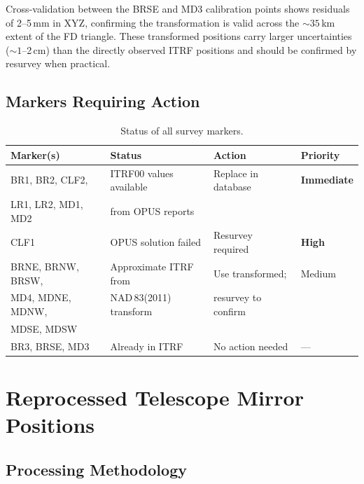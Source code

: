 \documentclass[11pt,letterpaper]{article}
\begin{document}
\noindent Cross-validation between the BRSE and MD3 calibration points shows residuals of 2--5\,mm in XYZ, confirming the transformation is valid across the $\sim\!35$\,km extent of the FD triangle. These transformed positions carry larger uncertainties ($\sim\!1$--2\,cm) than the directly observed ITRF positions and should be confirmed by resurvey when practical.

\subsection{Markers Requiring Action}

\begin{table}[H]
\centering
\caption{Status of all survey markers.}
\label{tab:status}
\smallskip
\begin{tabular}{@{}llll@{}}
\toprule
{Marker(s)} & {Status} & {Action} & {Priority} \\
\midrule
BR1, BR2, CLF2,     & ITRF00 values available & Replace in database & \textcolor{TAred}{\textbf{Immediate}} \\
LR1, LR2, MD1, MD2  & from OPUS reports       &                     & \\
\addlinespace
CLF1                 & OPUS solution failed    & Resurvey required   & \textcolor{TAred}{\textbf{High}} \\
\addlinespace
BRNE, BRNW, BRSW,   & Approximate ITRF from   & Use transformed;    & Medium \\
MD4, MDNE, MDNW,    & NAD\,83(2011) transform & resurvey to confirm & \\
MDSE, MDSW           &                         &                     & \\
\addlinespace
BR3, BRSE, MD3       & Already in ITRF         & No action needed    & --- \\
\bottomrule
\end{tabular}
\end{table}

\section{Reprocessed Telescope Mirror Positions}

\subsection{Processing Methodology}
\end{document}
